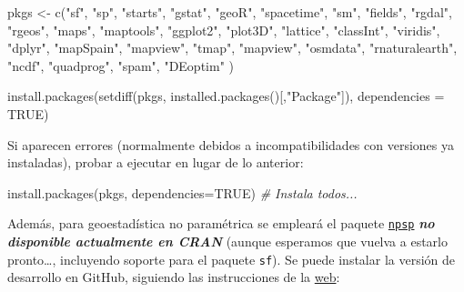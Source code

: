 \documentclass[
  spanish,
]{book}
\newenvironment{Shaded}{\begin{snugshade}}{\end{snugshade}}
\newcommand{\AttributeTok}[1]{\textcolor[rgb]{0.77,0.63,0.00}{#1}}
\newcommand{\CommentTok}[1]{\textcolor[rgb]{0.56,0.35,0.01}{\textit{#1}}}
\newcommand{\ConstantTok}[1]{\textcolor[rgb]{0.00,0.00,0.00}{#1}}
\newcommand{\FunctionTok}[1]{\textcolor[rgb]{0.00,0.00,0.00}{#1}}
\newcommand{\NormalTok}[1]{#1}
\newcommand{\OtherTok}[1]{\textcolor[rgb]{0.56,0.35,0.01}{#1}}
\newcommand{\StringTok}[1]{\textcolor[rgb]{0.31,0.60,0.02}{#1}}
\theoremstyle{break}
\begin{document}
\begin{Shaded}
\begin{Highlighting}[]
\NormalTok{pkgs }\OtherTok{\textless{}{-}} \FunctionTok{c}\NormalTok{(}\StringTok{"sf"}\NormalTok{, }\StringTok{"sp"}\NormalTok{, }\StringTok{"starts"}\NormalTok{, }\StringTok{"gstat"}\NormalTok{, }\StringTok{"geoR"}\NormalTok{, }\StringTok{"spacetime"}\NormalTok{, }\StringTok{"sm"}\NormalTok{, }\StringTok{"fields"}\NormalTok{, }
          \StringTok{"rgdal"}\NormalTok{, }\StringTok{"rgeos"}\NormalTok{, }\StringTok{"maps"}\NormalTok{, }\StringTok{"maptools"}\NormalTok{, }\StringTok{"ggplot2"}\NormalTok{, }\StringTok{"plot3D"}\NormalTok{, }\StringTok{"lattice"}\NormalTok{, }
          \StringTok{"classInt"}\NormalTok{, }\StringTok{"viridis"}\NormalTok{, }\StringTok{"dplyr"}\NormalTok{, }\StringTok{"mapSpain"}\NormalTok{, }\StringTok{"mapview"}\NormalTok{, }\StringTok{"tmap"}\NormalTok{, }\StringTok{"mapview"}\NormalTok{, }
          \StringTok{"osmdata"}\NormalTok{, }\StringTok{"rnaturalearth"}\NormalTok{, }\StringTok{"ncdf"}\NormalTok{, }\StringTok{"quadprog"}\NormalTok{, }\StringTok{"spam"}\NormalTok{, }\StringTok{"DEoptim"}\NormalTok{ )}

\FunctionTok{install.packages}\NormalTok{(}\FunctionTok{setdiff}\NormalTok{(pkgs, }\FunctionTok{installed.packages}\NormalTok{()[,}\StringTok{"Package"}\NormalTok{]), }\AttributeTok{dependencies =} \ConstantTok{TRUE}\NormalTok{)}
\end{Highlighting}
\end{Shaded}

Si aparecen errores (normalmente debidos a incompatibilidades con versiones ya instaladas), probar a ejecutar en lugar de lo anterior:

\begin{Shaded}
\begin{Highlighting}[]
\FunctionTok{install.packages}\NormalTok{(pkgs, }\AttributeTok{dependencies=}\ConstantTok{TRUE}\NormalTok{) }\CommentTok{\# Instala todos...}
\end{Highlighting}
\end{Shaded}

Además, para geoestadística no paramétrica se empleará el paquete \href{https://rubenfcasal.github.io/npsp}{\texttt{npsp}} \textbf{\emph{no disponible actualmente en CRAN}} (aunque esperamos que vuelva a estarlo pronto\ldots, incluyendo soporte para el paquete \texttt{sf}).
Se puede instalar la versión de desarrollo en GitHub, siguiendo las instrucciones de la \href{https://rubenfcasal.github.io/npsp/\#installation}{web}:
\end{document}
